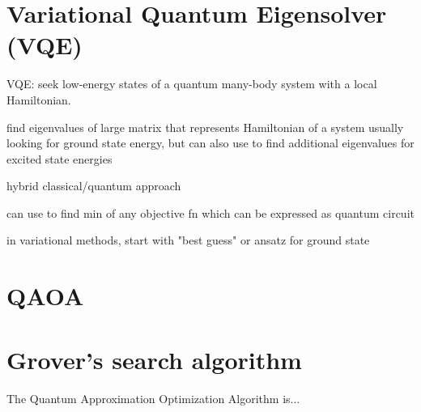 \documentclass[a4paper,landscape,columns=3]{CheatSheet}
\begin{document}

\section{Variational Quantum Eigensolver (VQE)}


VQE: seek low-energy states of a quantum many-body system with a local Hamiltonian.

find eigenvalues of large matrix that represents Hamiltonian of a system
usually looking for ground state energy, but can also use to find additional eigenvalues for excited state energies

hybrid classical/quantum approach

can use to find min of any objective fn which can be expressed as quantum circuit

in variational methods, start with "best guess" or ansatz for ground state





\section{QAOA}

\section{Grover's search algorithm}

The Quantum Approximation Optimization Algorithm is...

%
%

% 
\end{document}
